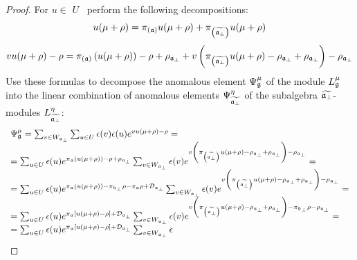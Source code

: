 \documentclass[12pt]{iopart}
\theoremstyle{definition}
\begin{document}
\begin{proof}
For $u\in $ $U$ \ perform the following decompositions:
\begin{equation*}
u(\mu +\rho )=\pi _{\left( \frak{a}\right) }u(\mu +\rho )+\pi _{\left(
\widetilde{\frak{a}_{\perp }}\right) }u(\mu +\rho )
\end{equation*}
\begin{equation*}
vu(\mu +\rho )-\rho =\pi _{\left( \frak{a}\right) }\left( u(\mu +\rho
)\right) -\rho +\rho _{\frak{a}_{\perp }}+v\left( \pi _{\left( \widetilde{%
\frak{a}_{\perp }}\right) }u(\mu +\rho )-\rho _{\frak{a}_{\perp }}+\rho _{%
\frak{a}_{\perp }}\right) -\rho _{\frak{a}_{\perp }}
\end{equation*}
Use these formulas to decompose the anomalous element $\Psi _{\frak{g}}^{\mu
}$ of the module $L_{\frak{g}}^{\mu }$ into the linear combination of
anomalous elements $\Psi _{\widetilde{\frak{a}_{\perp }}}^{\eta }$ of the
subalgebra $\widetilde{\frak{a}_{\perp }}$-modules $L_{\widetilde{\frak{a}%
_{\perp }}}^{\eta }$:
\begin{equation*}
\begin{array}{l}
\Psi _{\frak{g}}^{\mu }=\sum_{v\in W_{\frak{a}_{\perp }}}\sum_{u\in
U}\epsilon (v)\epsilon (u)e^{vu(\mu +\rho )-\rho }= \\
=\sum_{u\in U}\epsilon (u)e^{\pi _{\frak{a}}\left( u(\mu +\rho )\right)
-\rho +\rho _{\frak{a}_{\perp }}}\sum_{v\in W_{\frak{a}_{\perp }}}\epsilon
(v)e^{v\left( \pi _{\left( \widetilde{\frak{a}_{\perp }}\right) }u(\mu +\rho
)-\rho _{\frak{a}_{\perp }}+\rho _{\frak{a}_{\perp }}\right) -\rho _{\frak{a}%
_{\perp }}}= \\
=\sum_{u\in U}\epsilon (u)e^{\pi _{\frak{a}}\left( u(\mu +\rho )\right) -\pi
_{\frak{h}_{\perp }}\rho -\pi _{\frak{a}}\rho +\mathcal{D}_{\frak{a}_{\perp
}}}\sum_{v\in W_{\frak{a}_{\perp }}}\epsilon (v)e^{v\left( \pi _{\left(
\widetilde{\frak{a}_{\perp }}\right) }u(\mu +\rho )-\rho _{\frak{a}_{\perp
}}+\rho _{\frak{a}_{\perp }}\right) -\rho _{\frak{a}_{\perp }}}= \\
=\sum_{u\in U}\epsilon (u)e^{\pi _{\frak{a}}\left[ u(\mu +\rho )-\rho \right]
+\mathcal{D}_{\frak{a}_{\perp }}}\sum_{v\in W_{\frak{a}_{\perp }}}\epsilon
(v)e^{v\left( \pi _{\left( \widetilde{\frak{a}_{\perp }}\right) }u(\mu +\rho
)-\rho _{\frak{a}_{\perp }}+\rho _{\frak{a}_{\perp }}\right) -\pi _{\frak{h}%
_{\perp }}\rho -\rho _{\frak{a}_{\perp }}}= \\
=\sum_{u\in U}\epsilon (u)e^{\pi _{\frak{a}}\left[ u(\mu +\rho )-\rho \right]
+\mathcal{D}_{\frak{a}_{\perp }}}\sum_{v\in W_{\frak{a}_{\perp }}}\epsilon

\end{array}
\end{equation*}
\end{proof}
\end{document}
